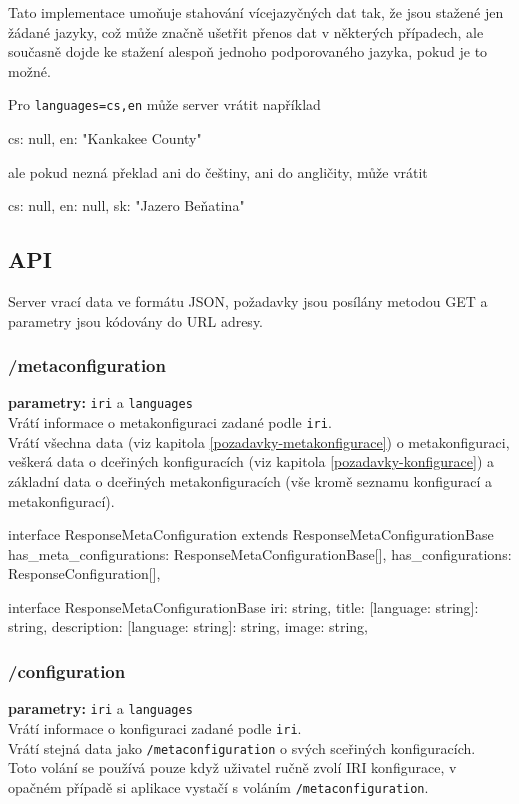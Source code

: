 Tato implementace umoňuje stahování vícejazyčných dat tak, že jsou stažené jen žádané jazyky, což může značně ušetřit přenos dat v některých případech, ale současně dojde ke stažení alespoň jednoho podporovaného jazyka, pokud je to možné.

\begin{prikl}
Pro \texttt{languages=cs,en} může server vrátit například
\begin{code}[frame=none]
{
    cs: null,
    en: "Kankakee County"
}
\end{code}
ale pokud nezná překlad ani do češtiny, ani do angličity, může vrátit
\begin{code}[frame=none]
{
    cs: null,
    en: null,
    sk: "Jazero Beňatina"
}
\end{code}
\end{prikl}

\subsection{API}
Server vrací data ve formátu JSON, požadavky jsou posílány metodou GET a parametry jsou kódovány do URL adresy.

\subsubsection{/metaconfiguration}
\textbf{parametry:} \texttt{iri} a \texttt{languages} \\
Vrátí informace o metakonfiguraci zadané podle \texttt{iri}. \\
Vrátí všechna data (viz kapitola \ref{pozadavky-metakonfigurace}) o metakonfiguraci, veškerá data o dceřiných konfiguracích (viz kapitola \ref{pozadavky-konfigurace}) a základní data o dceřiných metakonfiguracích (vše kromě seznamu konfigurací a metakonfigurací).

\begin{code}
interface ResponseMetaConfiguration extends
ResponseMetaConfigurationBase {
    has_meta_configurations: ResponseMetaConfigurationBase[],
    has_configurations: ResponseConfiguration[],
}

interface ResponseMetaConfigurationBase {
    iri: string,
    title: {[language: string]: string},
    description: {[language: string]: string},
    image: string,
}
\end{code}

\subsubsection{/configuration}
\textbf{parametry:} \texttt{iri} a \texttt{languages} \\
Vrátí informace o konfiguraci zadané podle \texttt{iri}. \\
Vrátí stejná data jako \texttt{/metaconfiguration} o svých sceřiných konfiguracích. \\
Toto volání se používá pouze když uživatel ručně zvolí IRI konfigurace, v opačném případě si aplikace vystačí s voláním \texttt{/metaconfiguration}.

